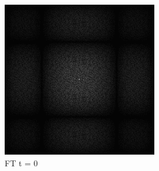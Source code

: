 \begin{figure}[H]

    \begin{subfigure}[b]{0.2\linewidth}
        \includegraphics[width=\linewidth]{content/TemporalerAlg/Bilder/Retargeting/Bedeutung Retargeting/Sorting_Small_Block_WithRetargeting/Spektrum/Ausschnitt1.png}
         \caption{FT t = 0}
         \label{pic:retarget_t0}
    \end{subfigure}
    \begin{subfigure}[b]{0.2\linewidth}

\end{subfigure}
\end{figure}
